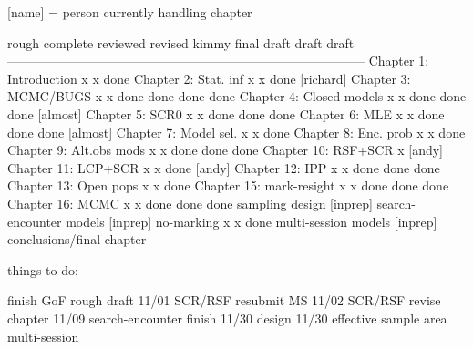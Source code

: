 [name] = person currently handling chapter


                          rough   complete reviewed  revised kimmy final 
                          draft    draft                           draft
------------------------------------------------------------------------------------
Chapter 1: Introduction       x       x     done    
Chapter 2: Stat. inf          x       x     done    [richard]
Chapter 3: MCMC/BUGS          x       x     done     done    done   done
Chapter 4: Closed models      x       x     done     done    done   [almost]
Chapter 5: SCR0               x       x     done     done    done
Chapter 6: MLE                x       x     done     done    done   [almost]
Chapter 7: Model sel.         x       x     done   
Chapter 8: Enc. prob          x       x     done
Chapter 9: Alt.obs mods       x       x     done     done    done
Chapter 10: RSF+SCR           x    [andy]
Chapter 11: LCP+SCR           x       x     done    [andy]
Chapter 12: IPP               x       x     done     done           done
Chapter 13: Open pops         x       x     done 
Chapter 15: mark-resight      x       x     done     done           done
Chapter 16: MCMC              x       x     done     done           done
sampling design            [inprep]
search-encounter models    [inprep]
no-marking                    x       x     done
multi-session models       [inprep]
conclusions/final chapter





things to do:

finish GoF rough draft   11/01
SCR/RSF resubmit MS      11/02
SCR/RSF revise chapter   11/09
search-encounter finish  11/30
design                   11/30
effective sample area  
multi-session
